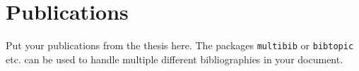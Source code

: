 

\chapter*{Publications} %


\bigskip

\noindent Put your publications from the thesis here. The packages \texttt{multibib} or \texttt{bibtopic} etc. can be used to handle multiple different bibliographies in your document.